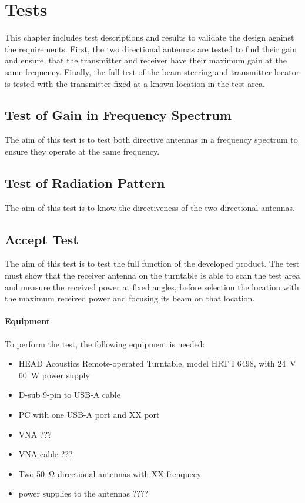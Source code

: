 \chapter{Tests}

This chapter includes test descriptions and results to validate the design against the requirements. First, the two directional antennas are tested to find their gain and ensure, that the transmitter and receiver have their maximum gain at the same frequency. Finally, the full test of the beam steering and transmitter locator is tested with the transmitter fixed at a known location in the test area.

\section{Test of Gain in Frequency Spectrum} 
The aim of this test is to test both directive antennas in a frequency spectrum to ensure they operate at the same frequency.


\section{Test of Radiation Pattern}
The aim of this test is to know the directiveness of the two directional antennas.


\section{Accept Test}
The aim of this test is to test the full function of the developed product. The test must show that the receiver antenna on the turntable is able to scan the test area and measure the received power at fixed angles, before selection the location with the maximum received power and focusing its beam on that location.

\subsubsection{Equipment}
To perform the test, the following equipment is needed:

\begin{itemize}
    \item HEAD Acoustics Remote-operated Turntable, model HRT I 6498, with \SI{24}{\volt} \SI{60}{W} power supply
    \item D-sub 9-pin to USB-A cable
    \item PC with one USB-A port and XX port
    \item VNA ???
    \item VNA cable ???
    \item Two \SI{50}{\ohm} directional antennas with XX frenquecy
    \item power supplies to the antennas ????
\end{itemize}

